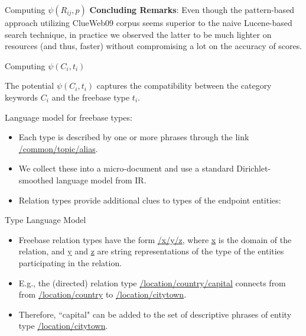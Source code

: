 \documentclass[pdf,11pt]{beamer}
\begin{document}
\begin{frame}{Computing $\psi(R_{ij},p)$}
\textbf{Concluding Remarks}: Even though the pattern-based approach utilizing ClueWeb09 corpus seems superior to the naive Lucene-based search technique, in practice we observed the latter to be much lighter on resources (and thus, faster) without compromising a lot on the accuracy of scores.

\end{frame}

\begin{frame}{Computing $\psi(C_i,t_i)$}
\begin{block}{}
The potential $\psi(C_i,t_i)$ captures the compatibility between the category keywords $C_i$ and the freebase type $t_i$.
\end{block}
Language model for freebase types:
\begin{itemize}
\item Each type is described by one or more phrases through the link \url{/common/topic/alias}.
\item  We collect these into a micro-document and use a standard Dirichlet-smoothed language model from IR.
\item Relation types provide additional clues to types of the endpoint entities:

\end{itemize}


\end{frame}

\begin{frame}{Type Language Model}
\begin{itemize}
\item Freebase relation types have the form \url{/x/y/z}, where \url{x} is the domain of the relation, and \url{y} and \url{z} are string representations of the type of the entities participating in the relation.
\item E.g., the (directed) relation type \url{/location/country/capital} connects from from \url{/location/country} to \url{/location/citytown}.
\item Therefore, ``capital" can be added to the set of descriptive phrases of entity type \url{/location/citytown}.
\end{itemize}
\end{frame}
\end{document}
